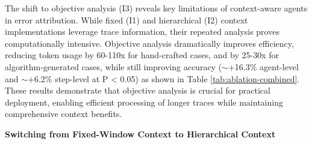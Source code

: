 \documentclass{article}
\begin{document}
The shift to objective analysis (I3) reveals key limitations of context-aware agents in error attribution. While fixed (I1) and hierarchical (I2) context implementations leverage trace information, their repeated analysis proves computationally intensive. Objective analysis dramatically improves efficiency, reducing token usage by 60-110x for hand-crafted cases, and by 25-30x for algorithm-generated cases, while still improving accuracy ($\sim$+16.3\% agent-level and $\sim$+6.2\% step-level at P < 0.05) as shown in Table \ref{tab:ablation-combined}. These results demonstrate that objective analysis is crucial for practical deployment, enabling efficient processing of longer traces while maintaining comprehensive context benefits.\newline

\textbf{Switching from Fixed-Window Context to Hierarchical Context}
\end{document}
